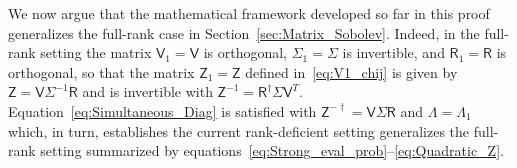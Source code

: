 \documentclass[english,12pt,jmp,graphicx]{revtex4-1}
\newcommand{\secref}[1]{Section~\ref{#1}}
\newcommand{\Hm}{\mathsf{H}}
\newcommand{\Um}{\mathsf{U}}
\newcommand{\Vm}{\mathsf{V}}
\newcommand{\Zm}{\mathsf{Z}}
\newcommand{\Rm}{\mathsf{R}}
\newcommand{\Ib}{\mathsf{I}}
\begin{document}
We now argue that the mathematical framework developed so far in this
proof generalizes the full-rank case in \secref{sec:Matrix_Sobolev}. Indeed,
in the full-rank setting the matrix $\Vm_1=\Vm$ 
is orthogonal, $\Sigma_1=\Sigma$ is invertible, and $\Rm_1=\Rm$ is orthogonal,
so that the matrix $\Zm_1=\Zm$ defined in~\eqref{eq:V1_chij} is given
by $\Zm=\Vm\Sigma^{-1}\Rm$ 
and is invertible with $\Zm^{-1}=\Rm^\dagger\Sigma\Vm^T$.
Equation~\eqref{eq:Simultaneous_Diag} is satisfied with
$\Zm^{-\dagger}=\Vm\Sigma\Rm$ and $\Lambda=\Lambda_1$ which, in turn,
establishes the current rank-deficient setting generalizes the
full-rank setting summarized by   
equations~\eqref{eq:Strong_eval_prob}--\eqref{eq:Quadratic_Z}.
\end{document}
